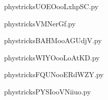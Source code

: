     \newcommand{\CaptionFigUOEOooLxhpSC}{<+Type your caption here+>}
    \begin{center}
        
    \end{center}
    phystricksUOEOooLxhpSC.py

    

    \clearpage
    


    \newcommand{\CaptionFigVMNerGf}{<+Type your caption here+>}
    \begin{center}
        
    \end{center}
    phystricksVMNerGf.py

    

    \clearpage
    


    \newcommand{\CaptionFigBAHMooAGUdjV}{<+Type your caption here+>}
    \begin{center}
        
    \end{center}
    phystricksBAHMooAGUdjV.py

    

    \clearpage
    


    \newcommand{\CaptionFigWIYOooLoAtKD}{<+Type your caption here+>}
    \begin{center}
        
    \end{center}
    phystricksWIYOooLoAtKD.py

    

    \clearpage
    


    \newcommand{\CaptionFigFQUNooERdWZY}{<+Type your caption here+>}
    \begin{center}
        
    \end{center}
    phystricksFQUNooERdWZY.py

    

    \clearpage
    


    \newcommand{\CaptionFigPYSIooVNiiuo}{<+Type your caption here+>}
    \begin{center}
        
    \end{center}
    phystricksPYSIooVNiiuo.py

